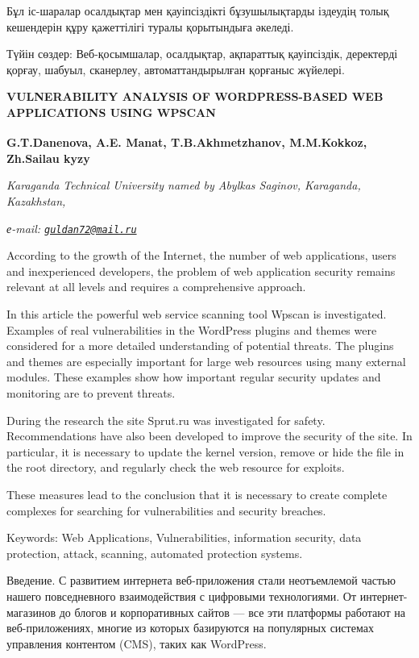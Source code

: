 Бұл іс-шаралар осалдықтар мен қауіпсіздікті бұзушылықтарды іздеудің
толық кешендерін құру қажеттілігі туралы қорытындыға әкеледі.

Түйін сөздер: Веб-қосымшалар, осалдықтар, ақпараттық қауіпсіздік,
деректерді қорғау, шабуыл, сканерлеу, автоматтандырылған қорғаныс
жүйелері.

{\bfseries VULNERABILITY ANALYSIS OF WORDPRESS-BASED WEB APPLICATIONS USING
WPSCAN}

{\bfseries G.T.Danenova\textsuperscript{\envelope }, A.E. Manat, T.B.Akhmetzhanov,
M.M.Kokkoz, Zh.Sailau kyzy}

\emph{Karaganda Technical University named by Abylkas Saginov,
Karaganda, Kazakhstan,}

\emph{е-mail:
\href{mailto:guldan72@mail.ru}{\nolinkurl{guldan72@mail.ru}}}

According to the growth of the Internet, the number of web applications,
users and inexperienced developers, the problem of web application
security remains relevant at all levels and requires a comprehensive
approach.

In this article the powerful web service scanning tool Wpscan is
investigated. Examples of real vulnerabilities in the WordPress plugins
and themes were considered for a more detailed understanding of
potential threats. The plugins and themes are especially important for
large web resources using many external modules. These examples show how
important regular security updates and monitoring are to prevent
threats.

During the research the site Sprut.ru was investigated for safety.
Recommendations have also been developed to improve the security of the
site. In particular, it is necessary to update the kernel version,
remove or hide the file in the root directory, and regularly check the
web resource for exploits.

These measures lead to the conclusion that it is necessary to create
complete complexes for searching for vulnerabilities and security
breaches.

Keywords: Web Applications, Vulnerabilities, information security, data
protection, attack, scanning, automated protection systems.

Введение. С развитием интернета веб-приложения стали неотъемлемой частью
нашего повседневного взаимодействия с цифровыми технологиями. От
интернет-магазинов до блогов и корпоративных сайтов --- все эти
платформы работают на веб-приложениях, многие из которых базируются на
популярных системах управления контентом (CMS), таких как WordPress.

